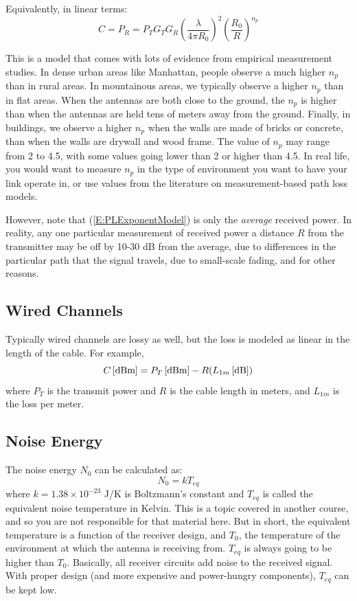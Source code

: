 Equivalently, in linear terms:
\[
C = P_R = P_T G_T G_R \left(\frac{ \lambda}{4\pi R_0}\right)^2 
\left( \frac{ R_0}{R}\right)^{n_p}
\]


This is a model that comes with lots of evidence from empirical measurement studies.  In dense urban areas like Manhattan, people observe a much higher $n_p$ than in rural areas.  In mountainous areas, we typically observe a higher $n_p$ than in flat areas.  When the antennas are both close to the ground, the $n_p$ is higher than when the antennas are held tens of meters away from the ground.  Finally, in buildings, we observe a higher $n_p$ when the walls are made of bricks or concrete, than when the walls are drywall and wood frame.  The value of $n_p$ may range from 2 to 4.5, with some values going lower than 2 or higher than 4.5.  In real life, you would want to measure $n_p$ in the type of environment you want to have your link operate in, or use values from the literature on measurement-based path loss models.

However, note that (\ref{E:PLExponentModel}) is only the \emph{average} received power.  In reality, any one particular measurement of received power a distance $R$ from the transmitter may be off by 10-30 dB from the average, due to differences in the particular path that the signal travels, due to small-scale fading, and for other reasons.


\subsection{Wired Channels}

Typically wired channels are lossy as well, but the loss is modeled as linear in the length of the cable.  For example, 
\[
 {C}\left[\mbox{dBm}\right] = {P_T}\left[\mbox{dBm}\right] - R ({L_{1m}}\left[\mbox{dB}\right])
\]
where $P_T$ is the transmit power and $R$ is the cable length in meters, and $L_{1m}$ is the loss per meter.  


\subsection{Noise Energy}

The noise energy $N_0$ can be calculated as:
\[
N_0 = kT_{eq}
\]
where $k = 1.38 \times 10^{-23}$ J/K is Boltzmann's constant and $T_{eq}$ is
called the equivalent noise temperature in Kelvin.  This is a topic covered in
another course, and so you are not responsible for that material
here.  But in short, the equivalent temperature is a function of the receiver design, and $T_0$, the temperature of the environment at which the antenna is receiving from.  
$T_{eq}$ is always going to be higher than $T_0$.  Basically, all receiver circuits add
noise to the received signal.  With proper design (and more expensive and power-hungry components), $T_{eq}$ can be kept low.  






